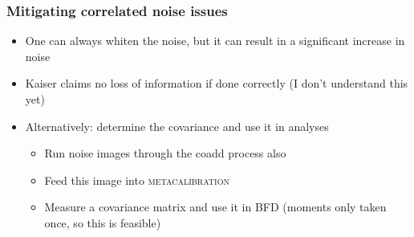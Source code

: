 \documentclass{beamer}
\newcommand{\mcal}{\textsc{metacalibration}}
\begin{document}
\frame
{
    \frametitle{Mitigating correlated noise issues}

    \begin{itemize}

        \item One can always whiten the noise, but it can result in a significant increase in noise

        \item Kaiser claims no loss of information if done correctly (I don't  understand this yet)

        \item Alternatively: determine the covariance and use it in analyses
            \begin{itemize}
                \item Run noise images through the coadd process also
                \item Feed this image into \mcal
                \item Measure a covariance matrix and use it in BFD (moments only taken once, so this is feasible)
            \end{itemize}


    \end{itemize}

}
\end{document}
